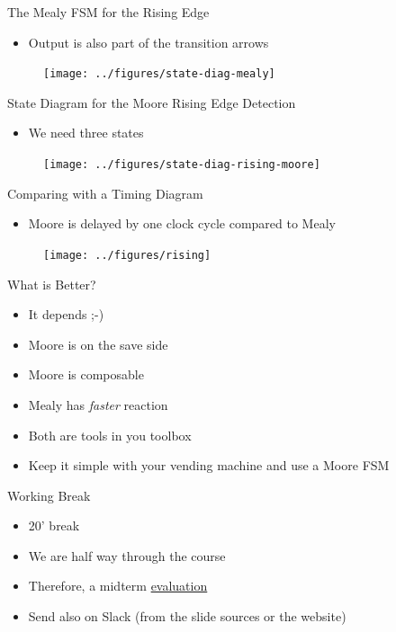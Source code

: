 \begin{frame}[fragile]{The Mealy FSM for the Rising Edge}
\begin{itemize}
\item Output is also part of the transition arrows
\end{itemize}
\begin{figure}
  \texttt{[image: ../figures/state-diag-mealy]}
\end{figure}
\end{frame}

\begin{frame}[fragile]{State Diagram for the Moore Rising Edge Detection}
\begin{itemize}
\item We need three states
\end{itemize}
\begin{figure}
  \texttt{[image: ../figures/state-diag-rising-moore]}
\end{figure}
\end{frame}

\begin{frame}[fragile]{Comparing with a Timing Diagram}
\begin{itemize}
\item Moore is delayed by one clock cycle compared to Mealy
\end{itemize}
\begin{figure}
  \texttt{[image: ../figures/rising]}
\end{figure}
\end{frame}

\begin{frame}[fragile]{What is Better?}
\begin{itemize}
\item It depends ;-)
\item Moore is on the save side
\item Moore is composable
\item Mealy has \emph{faster} reaction
\item Both are tools in you toolbox
\item Keep it simple with your vending machine and use a Moore FSM
\end{itemize}
\end{frame}

\begin{frame}[fragile]{Working Break}
\begin{itemize}
\item 20' break
\item We are half way through the course
\item Therefore, a midterm \href{https://docs.google.com/forms/d/e/1FAIpQLSd93nSVDE-sk75GtU3OgMB0TI7HxVB5i3KlDu0YILb39WMdIw/viewform?usp=sf_link}{evaluation}
\item Send also on Slack (from the slide sources or the website)
\end{itemize}
\end{frame}

